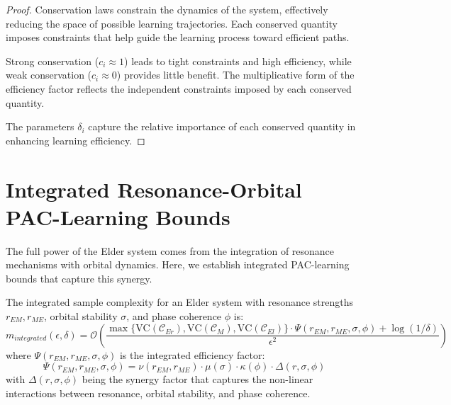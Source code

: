 \begin{proof}
Conservation laws constrain the dynamics of the system, effectively reducing the space of possible learning trajectories. Each conserved quantity imposes constraints that help guide the learning process toward efficient paths.

Strong conservation ($c_i \approx 1$) leads to tight constraints and high efficiency, while weak conservation ($c_i \approx 0$) provides little benefit. The multiplicative form of the efficiency factor reflects the independent constraints imposed by each conserved quantity.

The parameters $\delta_i$ capture the relative importance of each conserved quantity in enhancing learning efficiency.
\end{proof}

\section{Integrated Resonance-Orbital PAC-Learning Bounds}

The full power of the Elder system comes from the integration of resonance mechanisms with orbital dynamics. Here, we establish integrated PAC-learning bounds that capture this synergy.

\begin{theorem}
The integrated sample complexity for an Elder system with resonance strengths $r_{EM}, r_{ME}$, orbital stability $\sigma$, and phase coherence $\phi$ is:
\begin{equation}
m_{integrated}(\epsilon, \delta) = \mathcal{O}\left(\frac{\max\{\text{VC}(\mathcal{C}_{Er}), \text{VC}(\mathcal{C}_{M}), \text{VC}(\mathcal{C}_{El})\} \cdot \Psi(r_{EM}, r_{ME}, \sigma, \phi) + \log(1/\delta)}{\epsilon^2}\right)
\end{equation}
where $\Psi(r_{EM}, r_{ME}, \sigma, \phi)$ is the integrated efficiency factor:
\begin{equation}
\Psi(r_{EM}, r_{ME}, \sigma, \phi) = \nu(r_{EM}, r_{ME}) \cdot \mu(\sigma) \cdot \kappa(\phi) \cdot \Delta(r, \sigma, \phi)
\end{equation}
with $\Delta(r, \sigma, \phi)$ being the synergy factor that captures the non-linear interactions between resonance, orbital stability, and phase coherence.
\end{theorem}

